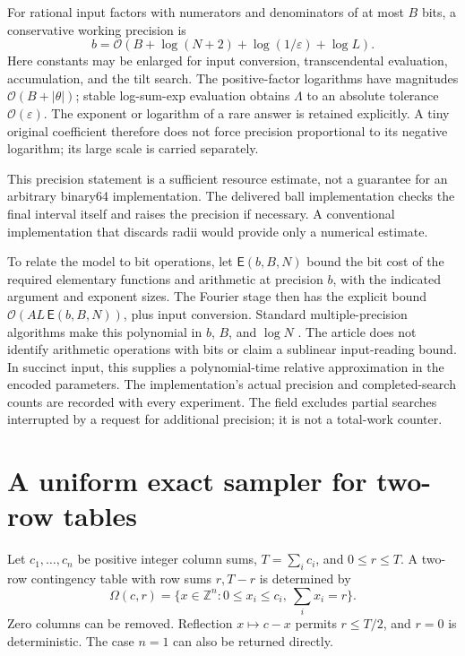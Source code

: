 \documentclass[11pt,a4paper]{article}
\theoremstyle{definition}
\newcommand{\Z}{\mathbb Z}
\newcommand{\abs}[1]{\left|#1\right|}
\newcommand{\code}[1]{\texttt{\detokenize{#1}}}
\newcommand{\BigO}{\mathcal O}
\begin{document}
For rational input factors with numerators and denominators of at most $B$ bits, a conservative working precision is
\begin{equation}\label{eq:precision}
 b=\BigO(B+\log(N+2)+\log(1/\varepsilon)+\log L).
\end{equation}
Here constants may be enlarged for input conversion, transcendental evaluation, accumulation, and the tilt search. The positive-factor logarithms have magnitudes $\BigO(B+\abs\theta)$; stable log-sum-exp evaluation obtains $\Lambda$ to an absolute tolerance $\BigO(\varepsilon)$. The exponent or logarithm of a rare answer is retained explicitly. A tiny original coefficient therefore does not force precision proportional to its negative logarithm; its large scale is carried separately.

This precision statement is a sufficient resource estimate, not a guarantee for an arbitrary binary64 implementation. The delivered ball implementation checks the final interval itself and raises the precision if necessary. A conventional implementation that discards radii would provide only a numerical estimate.

To relate the model to bit operations, let $\mathsf{E}(b,B,N)$ bound the bit cost of the required elementary functions and arithmetic at precision $b$, with the indicated argument and exponent sizes. The Fourier stage then has the explicit bound
$\BigO(A L\,\mathsf{E}(b,B,N))$, plus input conversion. Standard multiple-precision algorithms make this polynomial in $b$, $B$, and $\log N$ \cite{brent,johansson}. The article does not identify arithmetic operations with bits or claim a sublinear input-reading bound. In succinct input, this supplies a polynomial-time relative approximation in the encoded parameters. The implementation's actual precision and completed-search counts are recorded with every experiment. The field \code{tilt_evaluations} excludes partial searches interrupted by a request for additional precision; it is not a total-work counter.

\section{A uniform exact sampler for two-row tables}\label{sec:sampling}

Let $c_1,\ldots,c_n$ be positive integer column sums, $T=\sum_i c_i$, and $0\le r\le T$. A two-row contingency table with row sums $r,T-r$ is determined by
\begin{equation}\label{eq:omega}
 \Omega(c,r)=\{x\in\Z^n:0\le x_i\le c_i,\ \sum_i x_i=r\}.
\end{equation}
Zero columns can be removed. Reflection $x\mapsto c-x$ permits $r\le T/2$, and $r=0$ is deterministic. The case $n=1$ can also be returned directly.
\end{document}
